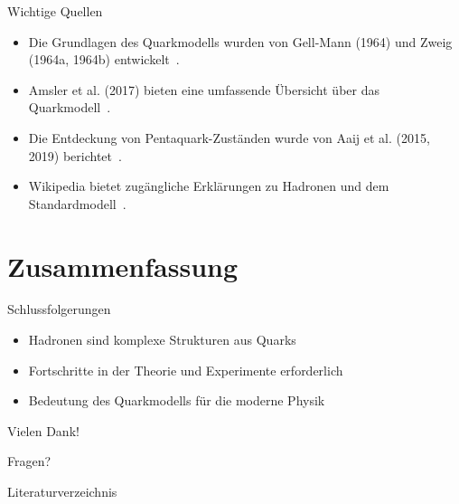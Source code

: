 \documentclass[aspectratio=169]{beamer} %
\begin{document}
    \begin{frame}{Wichtige Quellen}
        \begin{itemize}
            \item Die Grundlagen des Quarkmodells wurden von Gell-Mann (1964) und Zweig (1964a, 1964b) entwickelt~\cite{GellMann.1964, Zweig.1964, Zweig.1964b}.
            \item Amsler et al. (2017) bieten eine umfassende Übersicht über das Quarkmodell~\cite{C.Amsler.2017}.
            \item Die Entdeckung von Pentaquark-Zuständen wurde von Aaij et al. (2015, 2019) berichtet~\cite{Aaij.2019}.
            \item Wikipedia bietet zugängliche Erklärungen zu Hadronen und dem Standardmodell~\cite{Wikipedia.Hadron, Wikipedia.Standardmodell}.
        \end{itemize}
    \end{frame}
    
    \section{Zusammenfassung}
    \begin{frame}{Schlussfolgerungen}
        \begin{itemize}
            \item Hadronen sind komplexe Strukturen aus Quarks
            \item Fortschritte in der Theorie und Experimente erforderlich
            \item Bedeutung des Quarkmodells für die moderne Physik
        \end{itemize}
    \end{frame}
    
    \begin{frame}{Vielen Dank!}
        \begin{center}
            \Huge Fragen?
        \end{center}
    \end{frame}

    \begin{frame}[allowframebreaks]{Literaturverzeichnis}
        \printbibliography
    \end{frame}
    
\end{document}
